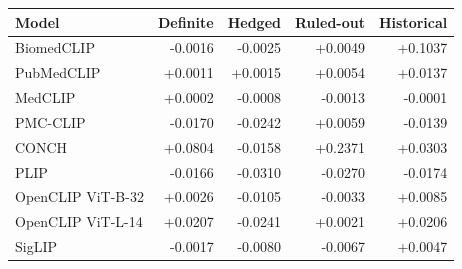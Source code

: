\begin{tabular}{lrrrr}
\toprule
Model & Definite & Hedged & Ruled-out & Historical \\
\midrule
BiomedCLIP & -0.0016 & -0.0025 & +0.0049 & +0.1037 \\
PubMedCLIP & +0.0011 & +0.0015 & +0.0054 & +0.0137 \\
MedCLIP & +0.0002 & -0.0008 & -0.0013 & -0.0001 \\
PMC-CLIP & -0.0170 & -0.0242 & +0.0059 & -0.0139 \\
CONCH & +0.0804 & -0.0158 & +0.2371 & +0.0303 \\
PLIP & -0.0166 & -0.0310 & -0.0270 & -0.0174 \\
OpenCLIP ViT-B-32 & +0.0026 & -0.0105 & -0.0033 & +0.0085 \\
OpenCLIP ViT-L-14 & +0.0207 & -0.0241 & +0.0021 & +0.0206 \\
SigLIP & -0.0017 & -0.0080 & -0.0067 & +0.0047 \\
\bottomrule
\end{tabular}
